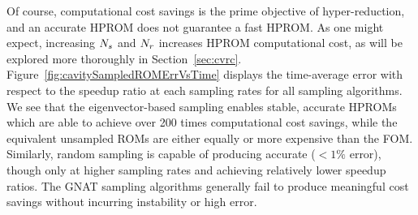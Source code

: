 Of course, computational cost savings is the prime objective of hyper-reduction, and an accurate HPROM does not guarantee a fast HPROM. As one might expect, increasing $N_s$ and $N_r$ increases HPROM computational cost, as will be explored more thoroughly in Section~\ref{sec:cvrc}. Figure~\ref{fig:cavitySampledROMErrVsTime} displays the time-average error with respect to the speedup ratio at each sampling rates for all sampling algorithms. We see that the eigenvector-based sampling enables stable, accurate HPROMs which are able to achieve over 200 times computational cost savings, while the equivalent unsampled ROMs are either equally or more expensive than the FOM. Similarly, random sampling is capable of producing accurate ($<1\%$ error), though only at higher sampling rates and achieving relatively lower speedup ratios. The GNAT sampling algorithms generally fail to produce meaningful cost savings without incurring instability or high error.

